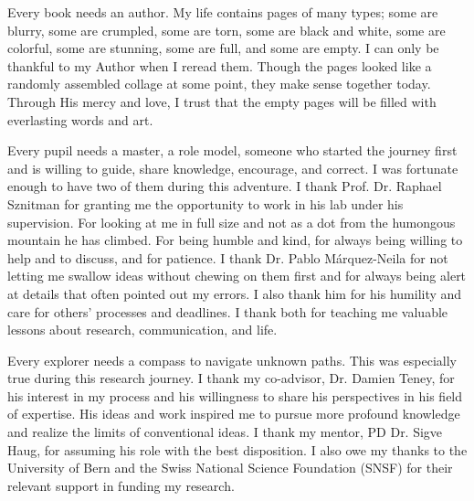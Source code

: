 \begin{acknowledgements}
\addchaptertocentry{\acknowledgementname} %
Every book needs an author. My life contains pages of many types; some are blurry, some are crumpled, some are torn, some are black and white, some are colorful, some are stunning, some are full, and some are empty. I can only be thankful to my Author when I reread them. Though the pages looked like a randomly assembled collage at some point, they make sense together today. Through His mercy and love, I trust that the empty pages will be filled with everlasting words and art. 

\medskip

Every pupil needs a master, a role model, someone who started the journey first and is willing to guide, share knowledge, encourage, and correct. I was fortunate enough to have two of them during this adventure. I thank Prof. Dr. Raphael Sznitman for granting me the opportunity to work in his lab under his supervision. For looking at me in full size and not as a dot from the humongous mountain he has climbed. For being humble and kind, for always being willing to help and to discuss, and for patience. I thank Dr. Pablo Márquez-Neila for not letting me swallow ideas without chewing on them first and for always being alert at details that often pointed out my errors. I also thank him for his humility and care for others' processes and deadlines. I thank both for teaching me valuable lessons about research, communication, and life.

\medskip

Every explorer needs a compass to navigate unknown paths. This was especially true during this research journey. I thank my co-advisor, Dr. Damien Teney, for his interest in my process and his willingness to share his perspectives in his field of expertise. His ideas and work inspired me to pursue more profound knowledge and realize the limits of conventional ideas. I thank my mentor, PD Dr. Sigve Haug, for assuming his role with the best disposition. I also owe my thanks to the University of Bern and the Swiss National Science Foundation (SNSF) for their relevant support in funding my research.

\medskip


\end{acknowledgements}
